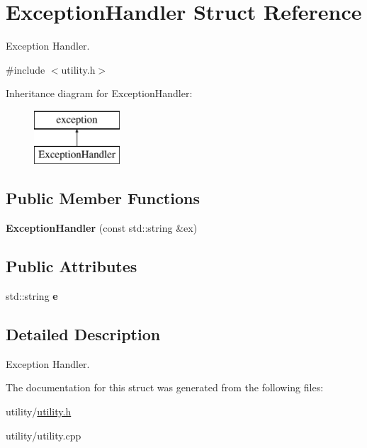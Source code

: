 \hypertarget{struct_exception_handler}{}\section{Exception\+Handler Struct Reference}
\label{struct_exception_handler}


Exception Handler.  




{\ttfamily \#include $<$utility.\+h$>$}

Inheritance diagram for Exception\+Handler\+:\begin{figure}[H]
\begin{center}
\leavevmode
\includegraphics[height=2.000000cm]{struct_exception_handler}
\end{center}
\end{figure}
\subsection*{Public Member Functions}
\begin{DoxyCompactItemize}
\item 
\hypertarget{struct_exception_handler_ae134c5213991a7b0983cdf8891a5f9e8}{}\label{struct_exception_handler_ae134c5213991a7b0983cdf8891a5f9e8} 
{\bfseries Exception\+Handler} (const std\+::string \&ex)
\end{DoxyCompactItemize}
\subsection*{Public Attributes}
\begin{DoxyCompactItemize}
\item 
\hypertarget{struct_exception_handler_ae18ca9e51660276419ca7e35d0b0db1c}{}\label{struct_exception_handler_ae18ca9e51660276419ca7e35d0b0db1c} 
std\+::string {\bfseries e}
\end{DoxyCompactItemize}


\subsection{Detailed Description}
Exception Handler. 

The documentation for this struct was generated from the following files\+:\begin{DoxyCompactItemize}
\item 
utility/\hyperlink{utility_8h}{utility.\+h}\item 
utility/utility.\+cpp\end{DoxyCompactItemize}
